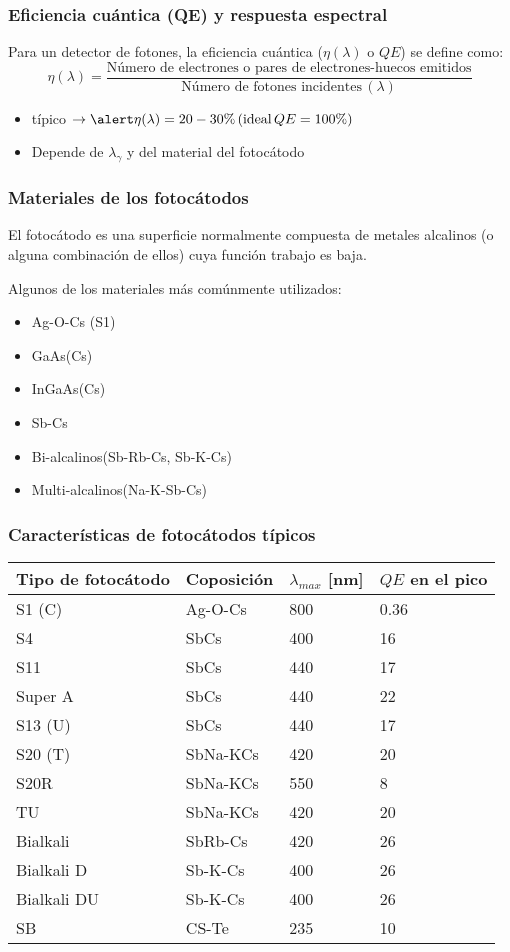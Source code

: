 \documentclass{beamer}
\begin{document}
\begin{frame}
\frametitle{Eficiencia cu\'antica (QE) y respuesta espectral}
Para un detector de fotones, la eficiencia cu\'antica ($\eta(\lambda)$ o $QE$) se define
como:
$$\eta(\lambda) = \frac{\text{N\'umero de electrones o pares de electrones-huecos
emitidos}}{\text{N\'umero de fotones incidentes}\,(\lambda)}$$

\begin{itemize}
\item t\'ipico $\rightarrow \alert{\eta(\lambda) = 20 - 30 \%}\, (\text{ideal}\, QE = 100 \%)$
\item Depende de $\lambda_{\gamma}$ y del material del fotoc\'atodo
\end{itemize}
\end{frame}

\begin{frame}
\frametitle{Materiales de los fotoc\'atodos}
\begin{block}{}
El fotoc\'atodo es una superficie normalmente compuesta de metales alcalinos (o
alguna combinaci\'on de ellos) cuya \alert{funci\'on trabajo} es baja. 
\end{block}
Algunos de los materiales m\'as com\'unmente utilizados:
\begin{itemize}
\item Ag-O-Cs (S1)
\item GaAs(Cs)
\item InGaAs(Cs)
\item Sb-Cs
\item Bi-alcalinos(Sb-Rb-Cs, Sb-K-Cs)
\item Multi-alcalinos(Na-K-Sb-Cs)
\end{itemize}
\end{frame} 

\begin{frame}
\frametitle{Caracter\'isticas de fotoc\'atodos t\'ipicos}
\begin{tabular}{l l l l} \hline
\textbf{Tipo de fotoc\'atodo} & \textbf{Coposici\'on} & \textbf{$\lambda_{max}$
[nm]} & \textbf{$QE$ en el pico} \\ \hline
S1 (C)  & Ag-O-Cs & 800 & 0.36 \\
S4      & SbCs   & 400 & 16 \\
S11     & SbCs    & 440 & 17 \\
Super A & SbCs    & 440 & 22 \\
S13 (U) & SbCs   & 440 & 17 \\
S20 (T) & SbNa-KCs   & 420 & 20 \\
S20R    & SbNa-KCs & 550 & 8 \\
TU      & SbNa-KCs & 420 & 20 \\
Bialkali    & SbRb-Cs & 420 & 26 \\
Bialkali D  & Sb-K-Cs & 400 & 26 \\
Bialkali DU & Sb-K-Cs & 400 & 26 \\
SB          & CS-Te & 235 & 10 \\ \hline
\end{tabular}
\end{frame}
\end{document}
